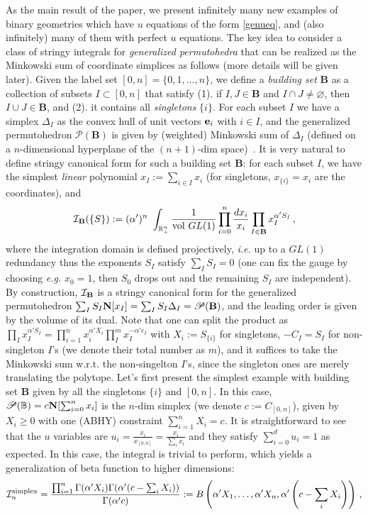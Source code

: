 \documentclass[hidelinks,12pt]{article}
\begin{document}
As the main result of the paper, we present infinitely many new examples of binary geometries which have $u$ equations of the form \eqref{genueq}, and (also infinitely) many of them with perfect $u$ equations. The key idea to consider a class of stringy integrals for {\it generalized permutohedra} that can be realized as the Minkowski sum of coordinate simplices as follows (more details will be given later). Given the label set $[0,n]=\{0,1,\dots, n\}$, we define a {\it building set} $\mathbf B$ as a collection of subsets $I \subset [0,n]$ that satisfy (1). if $I, J \in {\mathbf B}$ and $I\cap J\neq \varnothing$, then $I\cup J \in {\mathbf B}$, and (2). it contains all {\it singletons} $\{i\}$. For each subset $I$ we have a simplex $\Delta_I$ as the convex hull of unit vectors ${\bf e}_i$ with $i\in I$, and the generalized permutohedron ${\mathscr P}(\mathbf B)$ is given by (weighted) Minkowski sum of $\Delta_I$ (defined on a $n$-dimensional hyperplane of the $(n{+}1)$-dim space)~\cite{Postnikov:2005}.  It is very natural to define stringy canonical form for such a building set $\mathbf B$: for each subset $I$, we have the simplest {\it linear} polynomial $x_I:=\sum_{i\in I} x_i$ (for singletons, $x_{\{i\}}=x_i$ are the coordinates), and
\begin{equation}\label{intgenperm}
{\cal I}_{\mathbf B}(\{S\}):=(\alpha')^n~\int_{\mathbb R_+^n}\frac{1}{{\rm vol}~GL(1)} \prod_{i=0}^n \frac{d x_i}{x_i} %
\prod_{I \in {\mathbf B}} x_I^{\alpha' S_I}\,,
\end{equation}
where the integration domain is defined projectively, {\it i.e.} up to a $GL(1)$ redundancy thus the exponents $S_I$ satisfy $\sum_I S_I=0$ (one can fix the gauge by choosing {\it e.g.} $x_0=1$, then $S_0$ drops out and the remaining $S_I$ are independent). By construction, ${\cal I}_{\mathbf B}$ is a stringy canonical form for the generalized permutohedron $\sum_I S_I {\bf N} [x_I]=\sum_I S_I \Delta_I={\mathscr P}(\mathbf B)$, and the leading order is given by the volume of its dual. Note that one can split the product as $\prod_I x_I^{\alpha' S_I}=\prod_{i=1}^n x_i^{\alpha' X_i} \prod_I^m x_I^{-\alpha' c_I}$ with $X_i:=S_{\{i\}}$ for singletons, $-C_I=S_I$ for non-singleton $I$'s (we denote their total number as $m$), and it suffices to take the Minkowski sum w.r.t. the non-singelton $I$'s, since the singleton ones are merely translating the polytope. Let's first present the simplest example with building set ${\mathbf B}$ given by all the singletons $\{i\}$ and $[0,n]$. In this case, ${\mathscr P}(\mathbb B)=c {\bf N} [\sum_{i=0}^n x_i]$ is the $n$-dim simplex (we denote $c:=C_{[0, n]}$), given by $X_i \geq 0$ with one (ABHY) constraint $\sum_{i=1}^n X_i=c$. It is straightforward to see that the $u$ variables are $u_i=\frac{x_i}{x_{[0,n]}}=\frac{x_i}{\sum_i x_i}$ and they satisfy $\sum_{i=0}^d u_i=1$ as expected. In this case, the integral is trivial to perform, which yields a generalization of beta function to higher dimensions:
\[
{\cal I}^{\rm simplex}_n=\frac{\prod_{i=1}^n \Gamma(\alpha' X_i)\Gamma(\alpha'(c- \sum_i X_i))}{\Gamma(\alpha'c)}:=B\left(\alpha' X_1, \dots, \alpha' X_n,\alpha'\left(c- \sum_i X_i\right)\right)\,,
\]
\end{document}
